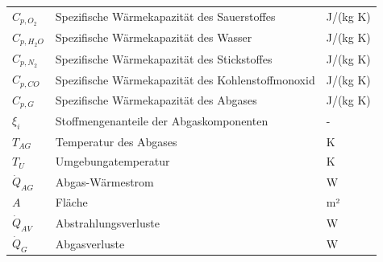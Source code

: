 \begin{longtable}{p{3 cm}p{10 cm}p{2 cm}}
\( C_{p,O_{2}}\)            & Spezifische Wärmekapazität des Sauerstoffes       &    J/(kg K)\\
\( C_{p,H_{2}O}\)           & Spezifische Wärmekapazität des Wasser 		       &   J/(kg K)\\
\( C_{p,N_{2}}\)            & Spezifische Wärmekapazität des Stickstoffes       &    J/(kg K)\\
\( C_{p,CO}\)               & Spezifische Wärmekapazität des Kohlenstoffmonoxid &    J/(kg K)\\
\( C_{p,G}\)                & Spezifische Wärmekapazität des Abgases            &    J/(kg K)\\
\( \xi_i \)                 & Stoffmengenanteile der Abgaskomponenten           &    -\\
\( T_{AG}\)                 & Temperatur des Abgases                            &    K\\
\( T_{U}\)                  & Umgebungatemperatur                               &    K\\
\(\dot{Q}_{AG}\)            & Abgas-Wärmestrom 				                   &   W\\
\( A \)                     & Fläche 						                   &       m²\\
\(\dot{Q}_{AV}\)            & Abstrahlungsverluste 		                       &   W\\
\(\dot{Q}_{G}\)             & Abgasverluste 					                   &   W\\
\end{longtable}